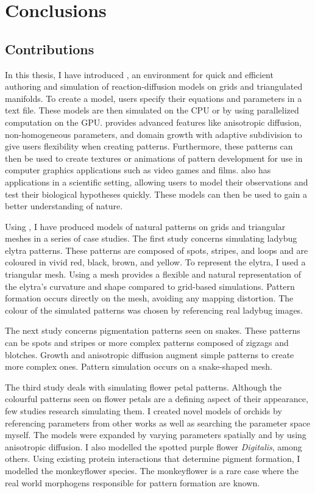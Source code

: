 \chapter{Conclusions}
\section{Contributions}
In this thesis, I have introduced \ProgramName{}, an environment for quick and efficient authoring and simulation of reaction-diffusion models on grids and triangulated manifolds. To create a model, users specify their equations and parameters in a text file. These models are then simulated on the CPU or by using parallelized computation on the GPU. \ProgramName{} provides advanced features like anisotropic diffusion, non-homogeneous parameters, and domain growth with adaptive subdivision to give users flexibility when creating patterns. Furthermore, these patterns can then be used to create textures or animations of pattern development for use in computer graphics applications such as video games and films. \ProgramName{} also has applications in a scientific setting, allowing users to model their observations and test their biological hypotheses quickly. These models can then be used to gain a better understanding of nature.

Using \ProgramName{}, I have produced models of natural patterns on grids and triangular meshes in a series of case studies. The first study concerns simulating ladybug elytra patterns. These patterns are composed of spots, stripes, and loops and are coloured in vivid red, black, brown, and yellow. To represent the elytra, I used a triangular mesh. Using a mesh provides a flexible and natural representation of the elytra's curvature and shape compared to grid-based simulations. Pattern formation occurs directly on the mesh, avoiding any mapping distortion. The colour of the simulated patterns was chosen by referencing real ladybug images.

The next study concerns pigmentation patterns seen on snakes. These patterns can be spots and stripes or more complex patterns composed of zigzags and blotches. Growth and anisotropic diffusion augment simple patterns to create more complex ones. Pattern simulation occurs on a snake-shaped mesh.

The third study deals with simulating flower petal patterns. Although the colourful patterns seen on flower petals are a defining aspect of their appearance, few studies research simulating them. I created novel models of orchids by referencing parameters from other works as well as searching the parameter space myself. The models were expanded by varying parameters spatially and by using anisotropic diffusion. I also modelled the spotted purple flower \textit{Digitalis}, among others. Using existing protein interactions that determine pigment formation, I modelled the monkeyflower species. The monkeyflower is a rare case where the real world morphogens responsible for pattern formation are known.

